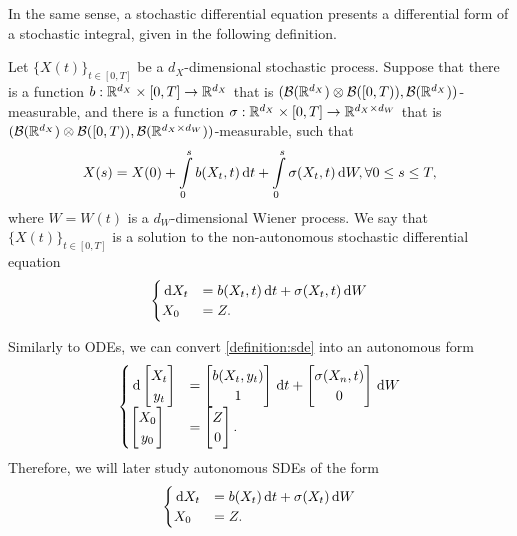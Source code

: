 In the same sense, a stochastic differential equation presents a differential form of a stochastic integral, given in the following definition.

\begin{definition}
  Let $\{X(t)\}_{t\in[0,T]}$ be a $d_X$-dimensional stochastic process. Suppose that there is a function $b:\mathbb{R}^{d_X}\times [0,T]\to\mathbb{R}^{d_X}$ that is $(\mathcal{B}(\mathbb{R}^{d_X})\otimes \mathcal{B}([0,T)),\mathcal{B}(\mathbb{R}^{d_X}))$-measurable, and there is a function $\sigma:\mathbb{R}^{d_X}\times [0,T]\to\mathbb{R}^{d_X\times d_W}$ that is $(\mathcal{B}(\mathbb{R}^{d_X})\otimes \mathcal{B}([0,T)), \mathcal{B}(\mathbb{R}^{d_X\times d_W}))$-measurable, such that
  $$X(s) = X(0)+\int\limits_{0}^s b(X_t,t)\,\mathrm{d} t + \int\limits_{0}^s \sigma(X_t,t)\,\mathrm{d} W, \forall 0\le s \le T,$$
  where $W = W(t)$ is a $d_W$-dimensional Wiener process. We say that $\{X(t)\}_{t\in[0,T]}$ is a solution to the non-autonomous stochastic differential equation
  \begin{equation}
    \label{definition:sde}
    \begin{cases}
      \,\mathrm{d} X_t & = b(X_t,t)\,\mathrm{d} t+\sigma(X_t,t)\,\mathrm{d} W \\
      X_{0}  & = Z.
    \end{cases}
  \end{equation}
\end{definition}

Similarly to ODEs, we can convert \ref{definition:sde} into an autonomous form
\begin{equation}
  \label{equation:autonomous-sde-convert}
  \begin{cases}
    \,\mathrm{d} \begin{bmatrix}
         X_t \\ y_t
       \end{bmatrix} & =
    \begin{bmatrix}
      b(X_t,y_t) \\ 1
    \end{bmatrix}
    \,\mathrm{d} t + \begin{bmatrix}
             \sigma(X_n,t) \\ 0
           \end{bmatrix}\,\mathrm{d} W            \\
    \begin{bmatrix}
      X_{0} \\ y_{0}
    \end{bmatrix}    & = \begin{bmatrix}
                           Z \\ 0
                         \end{bmatrix}.
  \end{cases}
\end{equation}
Therefore, we will later study autonomous SDEs of the form
\begin{equation}
  \label{definition:autonomous-sde}
  \begin{cases}
    \,\mathrm{d} X_t & = b(X_t)\,\mathrm{d} t+\sigma(X_t)\,\mathrm{d} W \\
    X_{0}  & = Z.
  \end{cases}
\end{equation}

